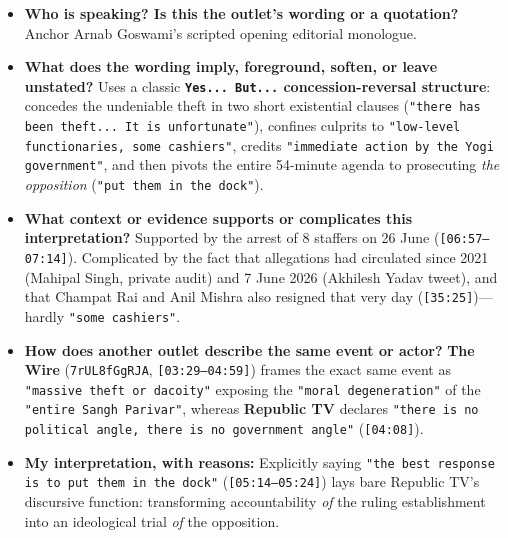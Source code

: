 \documentclass[10pt,a4paper]{article}
\begin{document}
\begin{itemize}[leftmargin=1.5em, itemsep=3pt, topsep=4pt]
  \item \textbf{Who is speaking? Is this the outlet's wording or a quotation?} Anchor Arnab Goswami's scripted opening editorial monologue.
  \item \textbf{What does the wording imply, foreground, soften, or leave unstated?} Uses a classic \textbf{\texttt{Yes... But...} concession-reversal structure}: concedes the undeniable theft in two short existential clauses (\texttt{"there has been theft... It is unfortunate"}), confines culprits to \texttt{"low-level functionaries, some cashiers"}, credits \texttt{"immediate action by the Yogi government"}, and then pivots the entire 54-minute agenda to prosecuting \textit{the opposition} (\texttt{"put them in the dock"}).
  \item \textbf{What context or evidence supports or complicates this interpretation?} Supported by the arrest of 8 staffers on 26 June (\texttt{[06:57--07:14]}). Complicated by the fact that allegations had circulated since 2021 (Mahipal Singh, private audit) and 7 June 2026 (Akhilesh Yadav tweet), and that Champat Rai and Anil Mishra also resigned that very day (\texttt{[35:25]})---hardly \texttt{"some cashiers"}.
  \item \textbf{How does another outlet describe the same event or actor?} \textbf{The Wire} (\texttt{7rUL8fGgRJA}, \texttt{[03:29--04:59]}) frames the exact same event as \texttt{"massive theft or dacoity"} exposing the \texttt{"moral degeneration"} of the \texttt{"entire Sangh Parivar"}, whereas \textbf{Republic TV} declares \texttt{"there is no political angle, there is no government angle"} (\texttt{[04:08]}).
  \item \textbf{My interpretation, with reasons:} Explicitly saying \texttt{"the best response is to put them in the dock"} (\texttt{[05:14--05:24]}) lays bare Republic TV's discursive function: transforming accountability \textit{of} the ruling establishment into an ideological trial \textit{of} the opposition.
\end{itemize}
\end{document}
